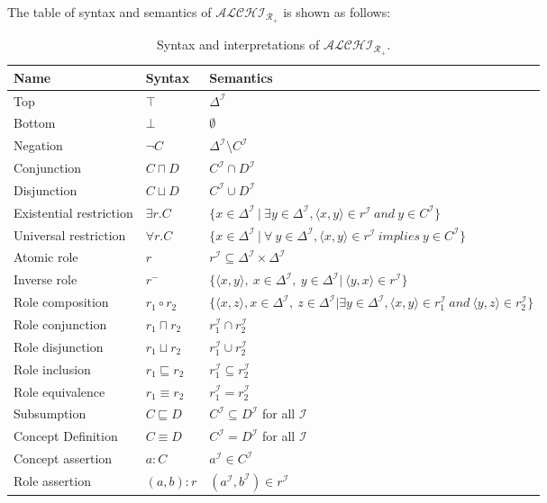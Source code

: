 \documentclass{article}
\begin{document}
The table of syntax and semantics of $\mathcal{ALCHI_{R_+}}$ is shown as follows:
 \begin{center}
 \begin{table}[H]
    \begin{tabular}{|p{4cm} | p{2cm} | p{10cm}| }
    \hline
      Name & Syntax & Semantics \\ \hline
    Top & $\top$ & $\Delta^\mathcal{I}$ \\
    Bottom & $\bot$ & $\emptyset$ \\ 
    Negation & $\neg C$ & $\Delta^\mathcal{I}\setminus C^\mathcal{I}$ \\ 
    Conjunction & $C\sqcap D$ & $C^\mathcal{I}\cap D^\mathcal{I}$  \\  
    Disjunction & $C\sqcup D$ &  $C^\mathcal{I}\cup D^\mathcal{I}$ \\  
    Existential restriction & $\exists r.C$ & $\{x\in \Delta^\mathcal{I}~|~ \exists y\in \Delta^\mathcal{I}, \langle x,y\rangle \in r^\mathcal{I}~and~y\in C^\mathcal{I}\}$ \\ 
    Universal restriction & $\forall r.C$ & $\{x\in \Delta^\mathcal{I}~|~ \forall~y\in \Delta^\mathcal{I}, \langle x,y\rangle \in r^\mathcal{I}~implies~y\in C^\mathcal{I}\}$ \\ \hline
    Atomic role & $r$ & $r^\mathcal{I}\subseteq \Delta^\mathcal{I} \times \Delta^\mathcal{I}$\\
    Inverse role & $r^-$ & $\{\langle x,y \rangle,~x\in \Delta^\mathcal{I},~y\in \Delta^\mathcal{I} | ~\langle y,x \rangle\in r^\mathcal{I}\}$\\ 
    Role composition & $r_1\circ r_2$ & $\{\langle x,z\rangle, x\in \Delta^\mathcal{I},~z\in \Delta^\mathcal{I}| \exists y\in \Delta^\mathcal{I},\langle x,y \rangle\in r_1^\mathcal{I}~and~\langle y,z\rangle\in r_2^\mathcal{I}\}$\\
    Role conjunction & $r_1\sqcap r_2$ & $r_1^\mathcal{I} \cap r_2^\mathcal{I}$ \\
    Role disjunction & $r_1\sqcup r_2$ & $r_1^\mathcal{I} \cup r_2^\mathcal{I}$ \\
    Role inclusion & $r_1\sqsubseteq r_2$ &  $r_1^\mathcal{I} \subseteq r_2^\mathcal{I}$\\
    Role equivalence & $r_1\equiv r_2$ & $r_1^\mathcal{I} = r_2^\mathcal{I}$\\    \hline
    Subsumption & $C\sqsubseteq D$ & $C^\mathcal{I}\subseteq D^\mathcal{I}$ for all $\mathcal{I}$\\
    Concept Definition & $C\equiv D$ & $C^\mathcal{I}= D^\mathcal{I}$ for all $\mathcal{I}$\\ \hline
    Concept assertion & $a:C$ & $a^\mathcal{I}\in C^\mathcal{I}$ \\
    Role assertion & $(a,b):r$ & $(a^\mathcal{I},b^\mathcal{I})\in r^\mathcal{I}$ \\ \hline
    \end{tabular}
    \caption{Syntax and interpretations of $\mathcal{ALCHI_{R_+}}$.}
    \label{tab:interpretation}
\end{table}
\end{center} 
\end{document}
